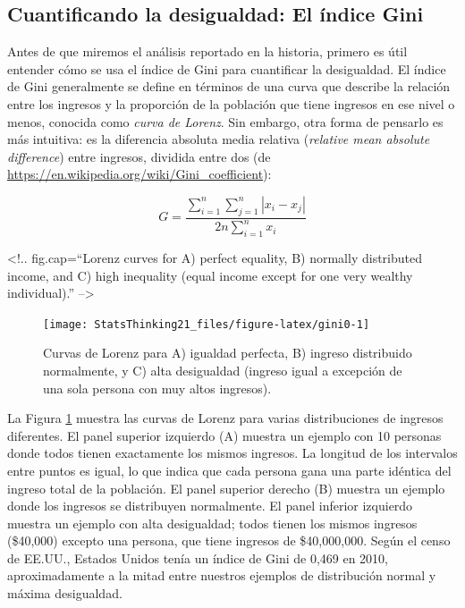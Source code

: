\documentclass[
  12pt,
]{book}
\begin{document}
\hypertarget{cuantificando-la-desigualdad-el-uxedndice-gini}{%
\subsection{Cuantificando la desigualdad: El índice Gini}\label{cuantificando-la-desigualdad-el-uxedndice-gini}}

Antes de que miremos el análisis reportado en la historia, primero es útil entender cómo se usa el índice de Gini para cuantificar la desigualdad. El índice de Gini generalmente se define en términos de una curva que describe la relación entre los ingresos y la proporción de la población que tiene ingresos en ese nivel o menos, conocida como \emph{curva de Lorenz}. Sin embargo, otra forma de pensarlo es más intuitiva: es la diferencia absoluta media relativa (\emph{relative mean absolute difference}) entre ingresos, dividida entre dos (de \url{https://en.wikipedia.org/wiki/Gini_coefficient}):

\[
G = \frac{\displaystyle{\sum_{i=1}^n \sum_{j=1}^n \left| x_i - x_j \right|}}{\displaystyle{2n\sum_{i=1}^n x_i}} 
\]

\textless!.. fig.cap=``Lorenz curves for A) perfect equality, B) normally distributed income, and C) high inequality (equal income except for one very wealthy individual).'' --\textgreater{}

\begin{figure}
\texttt{[image: StatsThinking21\_files/figure-latex/gini0-1]} \caption{Curvas de Lorenz para A) igualdad perfecta, B) ingreso distribuido normalmente, y C) alta desigualdad (ingreso igual a excepción de una sola persona con muy altos ingresos).}\label{fig:gini0}
\end{figure}

La Figura \ref{fig:gini0} muestra las curvas de Lorenz para varias distribuciones de ingresos diferentes. El panel superior izquierdo (A) muestra un ejemplo con 10 personas donde todos tienen exactamente los mismos ingresos. La longitud de los intervalos entre puntos es igual, lo que indica que cada persona gana una parte idéntica del ingreso total de la población. El panel superior derecho (B) muestra un ejemplo donde los ingresos se distribuyen normalmente. El panel inferior izquierdo muestra un ejemplo con alta desigualdad; todos tienen los mismos ingresos (\$40,000) excepto una persona, que tiene ingresos de \$40,000,000. Según el censo de EE.UU., Estados Unidos tenía un índice de Gini de 0,469 en 2010, aproximadamente a la mitad entre nuestros ejemplos de distribución normal y máxima desigualdad.
\end{document}
